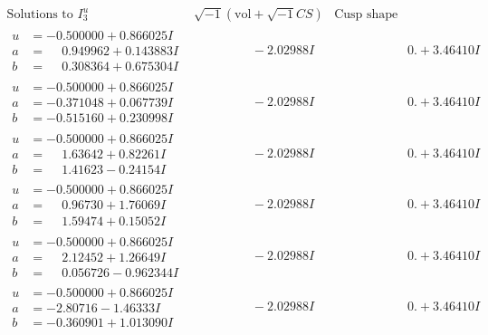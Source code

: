 \documentclass[1p]{elsarticle_modified}
\theoremstyle{definition}
\newcommand{\I}{\sqrt{-1}}
\begin{document}
$$\begin{array}{c|c|c}  
\text{Solutions to }I^u_{3}& \I (\text{vol} + \sqrt{-1}CS) & \text{Cusp shape}\\
 \hline 
\begin{aligned}
u &= -0.500000 + 0.866025 I \\
a &= \phantom{-}0.949962 + 0.143883 I \\
b &= \phantom{-}0.308364 + 0.675304 I\end{aligned}
 & \phantom{-0.000000 } -2.02988 I & \phantom{-0.000000 -}0. + 3.46410 I \\ \hline\begin{aligned}
u &= -0.500000 + 0.866025 I \\
a &= -0.371048 + 0.067739 I \\
b &= -0.515160 + 0.230998 I\end{aligned}
 & \phantom{-0.000000 } -2.02988 I & \phantom{-0.000000 -}0. + 3.46410 I \\ \hline\begin{aligned}
u &= -0.500000 + 0.866025 I \\
a &= \phantom{-}1.63642 + 0.82261 I \\
b &= \phantom{-}1.41623 - 0.24154 I\end{aligned}
 & \phantom{-0.000000 } -2.02988 I & \phantom{-0.000000 -}0. + 3.46410 I \\ \hline\begin{aligned}
u &= -0.500000 + 0.866025 I \\
a &= \phantom{-}0.96730 + 1.76069 I \\
b &= \phantom{-}1.59474 + 0.15052 I\end{aligned}
 & \phantom{-0.000000 } -2.02988 I & \phantom{-0.000000 -}0. + 3.46410 I \\ \hline\begin{aligned}
u &= -0.500000 + 0.866025 I \\
a &= \phantom{-}2.12452 + 1.26649 I \\
b &= \phantom{-}0.056726 - 0.962344 I\end{aligned}
 & \phantom{-0.000000 } -2.02988 I & \phantom{-0.000000 -}0. + 3.46410 I \\ \hline\begin{aligned}
u &= -0.500000 + 0.866025 I \\
a &= -2.80716 - 1.46333 I \\
b &= -0.360901 + 1.013090 I\end{aligned}
 & \phantom{-0.000000 } -2.02988 I & \phantom{-0.000000 -}0. + 3.46410 I \\ \hline\begin{aligned}

\end{aligned}
\end{array}$$
\end{document}
